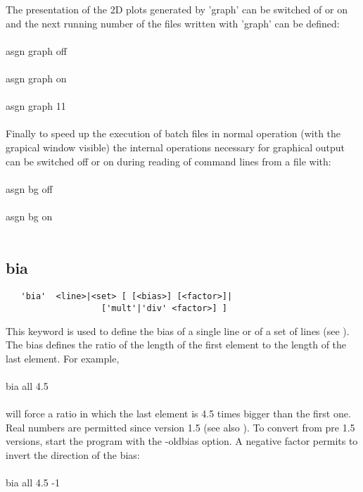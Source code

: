 \documentclass{article}
\begin{document}
The presentation of the 2D plots generated by 'graph' can be switched of or on and the next running number of the files written with 'graph' can be defined:\\\\asgn graph off\\\\asgn graph on\\\\asgn graph 11\\\\

Finally to speed up the execution of batch files in normal operation (with the grapical window visible) the internal operations necessary for graphical output can be switched off or on during reading of command lines from a file with:\\\\asgn bg off\\\\asgn bg on\\\\

\subsection{\label{bia}bia}
\begin{verbatim}
   'bia'  <line>|<set> [ [<bias>] [<factor>]|
                   ['mult'|'div' <factor>] ]
\end{verbatim}
This keyword is used to define the bias of a single line or of a set of lines (see ). The bias defines the ratio of the length of the first element to the length of the last element. For example,\\\\
bia all 4.5\\\\will force a ratio in which the last element is 4.5 times bigger than the first one. Real numbers are permitted since version 1.5 (see also ). To convert from pre 1.5 versions, start the program with the -oldbias option. A negative factor permits to invert the direction of the bias: \\\\
bia all 4.5 -1\\\\
\end{document}
